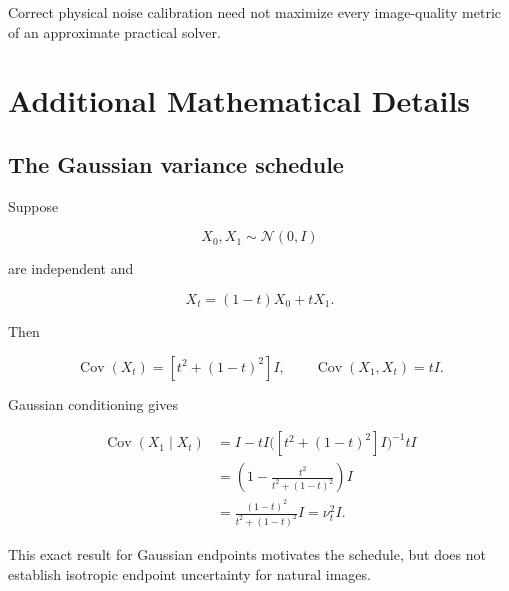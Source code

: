 \documentclass[11pt,a4paper]{article}
\newcommand{\Cov}{\operatorname{Cov}}
\newcommand{\Normal}{\mathcal{N}}
\begin{document}
Correct physical noise calibration need not maximize every
image-quality metric of an approximate practical solver.



\appendix

\section{Additional Mathematical Details}


\subsection{The Gaussian variance schedule}

Suppose

\begin{equation}
    X_0,X_1
    \sim
    \Normal(0,I)
\end{equation}

are independent and

\begin{equation}
    X_t=(1-t)X_0+tX_1.
\end{equation}

Then

\begin{equation}
    \Cov(X_t)
    =
    [t^2+(1-t)^2]I,
    \qquad
    \Cov(X_1,X_t)
    =
    tI.
\end{equation}

Gaussian conditioning gives

\begin{align}
    \Cov(X_1\mid X_t)
    &=
    I
    -
    tI
    \bigl(
        [t^2+(1-t)^2]I
    \bigr)^{-1}
    tI
    \\
    &=
    \left(
        1
        -
        \frac{t^2}{t^2+(1-t)^2}
    \right)I
    \\
    &=
    \frac{(1-t)^2}{t^2+(1-t)^2}I
    =
    \nu_t^2I.
\end{align}

This exact result for Gaussian endpoints motivates the schedule,
but does not establish isotropic endpoint uncertainty for natural images.


\end{document}
